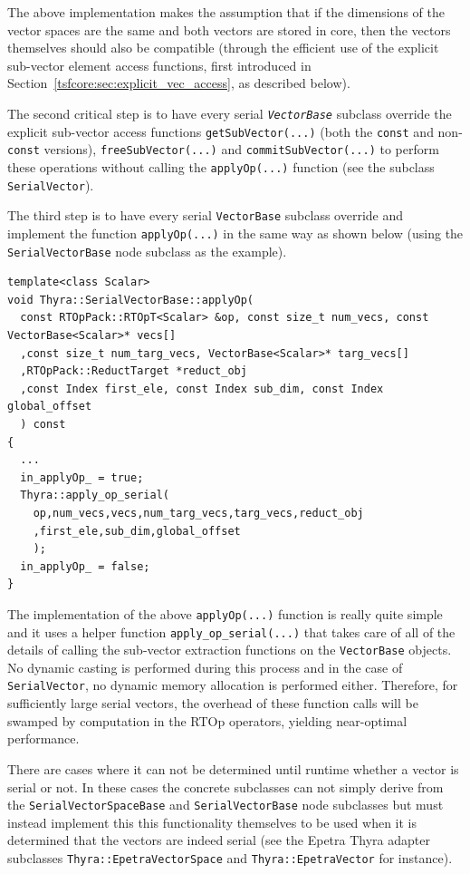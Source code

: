 \documentclass[pdf,ps2pdf,11pt]{SANDreport}
\begin{document}
{}\noindent{}The above implementation makes the assumption that if the
dimensions of the vector spaces are the same and both vectors are stored in
core, then the vectors themselves should also be compatible (through the
efficient use of the explicit sub-vector element access functions, first
introduced in Section~\ref{tsfcore:sec:explicit_vec_access}, as described
below).

The second critical step is to have every serial
{}\texttt{\textit{Vector\-Base}} subclass override the explicit sub-vector
access functions {}\texttt{getSubVector(...)} (both the {}\texttt{const}
and non-\texttt{const} versions), {}\texttt{free\-Sub\-Vector(...)} 
and {}\texttt{commit\-Sub\-Vector(...)} to perform these operations
without calling the {}\texttt{applyOp(\-...)} function (see the subclass
{}\texttt{SerialVector}).

The third step is to have every serial {}\texttt{Vector\-Base} subclass
override and implement the function {}\texttt{applyOp(\-...)} in the
same way as shown below (using the {}\texttt{SerialVectorBase} node
subclass as the example).

{\scriptsize\begin{verbatim}
template<class Scalar>
void Thyra::SerialVectorBase::applyOp(
  const RTOpPack::RTOpT<Scalar> &op, const size_t num_vecs, const VectorBase<Scalar>* vecs[]
  ,const size_t num_targ_vecs, VectorBase<Scalar>* targ_vecs[]
  ,RTOpPack::ReductTarget *reduct_obj
  ,const Index first_ele, const Index sub_dim, const Index global_offset
  ) const
{
  ...
  in_applyOp_ = true;
  Thyra::apply_op_serial(
    op,num_vecs,vecs,num_targ_vecs,targ_vecs,reduct_obj
    ,first_ele,sub_dim,global_offset
    );
  in_applyOp_ = false;
}
\end{verbatim}}

{}\noindent{}The implementation of the above {}\texttt{applyOp(\-...)}
function is really quite simple and it uses a helper function
{}\texttt{apply\_op\_serial(...)}  that takes care of all of the
details of calling the sub-vector extraction functions on the
{}\texttt{Vector\-Base} objects.  No dynamic casting is performed during
this process and in the case of {}\texttt{SerialVector}, no dynamic
memory allocation is performed either.  Therefore, for sufficiently
large serial vectors, the overhead of these function calls will be
swamped by computation in the RTOp operators, yielding near-optimal
performance.

There are cases where it can not be determined until runtime whether a
vector is serial or not.  In these cases the concrete subclasses can
not simply derive from the {}\texttt{Serial\-VectorSpace\-Base} and
{}\texttt{SerialVectorBase} node subclasses but must instead implement
this this functionality themselves to be used when it is determined
that the vectors are indeed serial (see the Epetra Thyra adapter
subclasses {}\texttt{Thyra::EpetraVectorSpace} and
{}\texttt{Thyra::EpetraVector} for instance).
\end{document}
